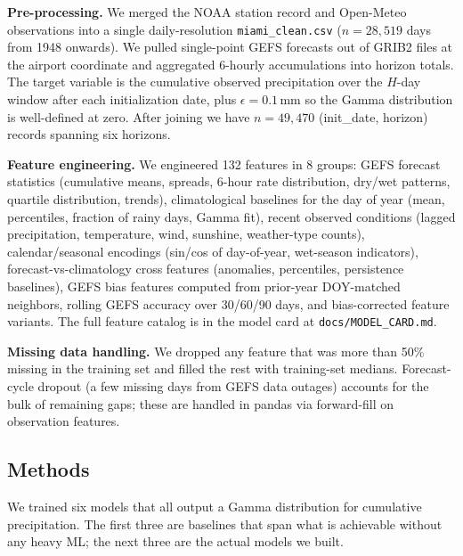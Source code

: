 \documentclass[11pt]{article}
\begin{document}
\textbf{Pre-processing.} We merged the NOAA station record and Open-Meteo observations into a single daily-resolution \texttt{miami\_clean.csv} ($n=28{,}519$ days from 1948 onwards). We pulled single-point GEFS forecasts out of GRIB2 files at the airport coordinate and aggregated 6-hourly accumulations into horizon totals. The target variable is the cumulative observed precipitation over the $H$-day window after each initialization date, plus $\epsilon = 0.1$\,mm so the Gamma distribution is well-defined at zero. After joining we have $n=49{,}470$ (init\_date, horizon) records spanning six horizons.

\textbf{Feature engineering.} We engineered 132 features in 8 groups: GEFS forecast statistics (cumulative means, spreads, 6-hour rate distribution, dry/wet patterns, quartile distribution, trends), climatological baselines for the day of year (mean, percentiles, fraction of rainy days, Gamma fit), recent observed conditions (lagged precipitation, temperature, wind, sunshine, weather-type counts), calendar/seasonal encodings (sin/cos of day-of-year, wet-season indicators), forecast-vs-climatology cross features (anomalies, percentiles, persistence baselines), GEFS bias features computed from prior-year DOY-matched neighbors, rolling GEFS accuracy over 30/60/90 days, and bias-corrected feature variants. The full feature catalog is in the model card at \texttt{docs/MODEL\_CARD.md}.

\textbf{Missing data handling.} We dropped any feature that was more than 50\% missing in the training set and filled the rest with training-set medians. Forecast-cycle dropout (a few missing days from GEFS data outages) accounts for the bulk of remaining gaps; these are handled in pandas via forward-fill on observation features.

\subsection{Methods}

We trained six models that all output a Gamma distribution for cumulative precipitation. The first three are baselines that span what is achievable without any heavy ML; the next three are the actual models we built.
\end{document}
